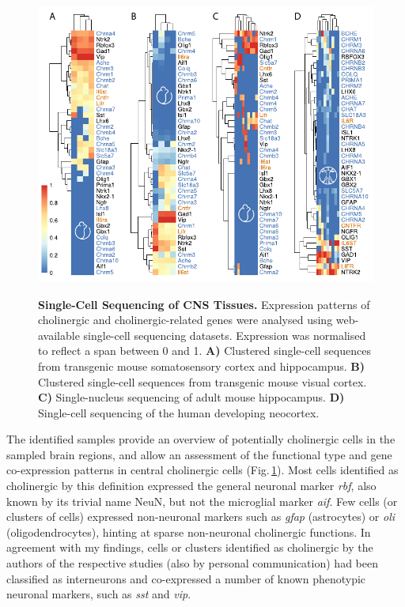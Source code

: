 \begin{figure}
\centering
\includegraphics[height=10cm]{figures/singlecell}
\caption[Single-Cell Sequencing of CNS Tissues.]{\textbf{Single-Cell Sequencing of CNS Tissues.} Expression patterns of cholinergic and cholinergic-related genes were analysed using web-available single-cell sequencing datasets. Expression was normalised to reflect a span between 0 and 1. \textbf{A)} Clustered single-cell sequences from transgenic mouse somatosensory cortex and hippocampus\cite{Zeisel2015}. \textbf{B)} Clustered single-cell sequences from transgenic mouse visual cortex\cite{Tasic2016}. \textbf{C)} Single-nucleus sequencing of adult mouse hippocampus\cite{Habib2016}. \textbf{D)} Single-cell sequencing of the human developing neocortex\cite{Darmanis2015}. 
\label{fig:singlecell}}
\end{figure}

The identified samples provide an overview of potentially cholinergic cells in the sampled brain regions, and allow an assessment of the functional type and gene co-expression patterns in central cholinergic cells (Fig.\,\ref{fig:singlecell}). Most cells identified as cholinergic by this definition expressed the general neuronal marker \textit{\acs{rbf}}, also known by its trivial name NeuN, but not the microglial marker \textit{\acs{aif}}. Few cells (or clusters of cells) expressed non-neuronal markers such as \textit{\acs{gfap}} (astrocytes) or \textit{\acs{oli}} (oligodendrocytes), hinting at sparse non-neuronal cholinergic functions. In agreement with my findings, cells or clusters identified as cholinergic by the authors of the respective studies\cite{Zeisel2015, Tasic2016} (also by personal communication) had been classified as interneurons and co-expressed a number of known phenotypic neuronal markers, such as \textit{\ac{sst}} and \textit{\ac{vip}}.

